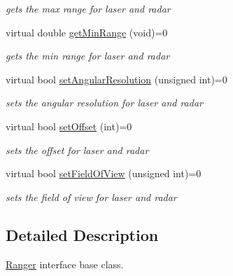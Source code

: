 \begin{DoxyCompactItemize}
\begin{DoxyCompactList}\small\item\em gets the max range for laser and radar \end{DoxyCompactList}\item 
virtual double \hyperlink{classRangerInterface_ae6d501ddeeaad4a7b44d7d51ce64cb88}{get\+Min\+Range} (void)=0\hypertarget{classRangerInterface_ae6d501ddeeaad4a7b44d7d51ce64cb88}{}\label{classRangerInterface_ae6d501ddeeaad4a7b44d7d51ce64cb88}

\begin{DoxyCompactList}\small\item\em gets the min range for laser and radar \end{DoxyCompactList}\item 
virtual bool \hyperlink{classRangerInterface_a313296ae5d13c6acce69caaf646ea66e}{set\+Angular\+Resolution} (unsigned int)=0\hypertarget{classRangerInterface_a313296ae5d13c6acce69caaf646ea66e}{}\label{classRangerInterface_a313296ae5d13c6acce69caaf646ea66e}

\begin{DoxyCompactList}\small\item\em sets the angular resolution for laser and radar \end{DoxyCompactList}\item 
virtual bool \hyperlink{classRangerInterface_ae72584d83c94678d76f3fca20e432713}{set\+Offset} (int)=0\hypertarget{classRangerInterface_ae72584d83c94678d76f3fca20e432713}{}\label{classRangerInterface_ae72584d83c94678d76f3fca20e432713}

\begin{DoxyCompactList}\small\item\em sets the offset for laser and radar \end{DoxyCompactList}\item 
virtual bool \hyperlink{classRangerInterface_ad10f43a01e5285a654f09357028b1bb4}{set\+Field\+Of\+View} (unsigned int)=0\hypertarget{classRangerInterface_ad10f43a01e5285a654f09357028b1bb4}{}\label{classRangerInterface_ad10f43a01e5285a654f09357028b1bb4}

\begin{DoxyCompactList}\small\item\em sets the field of view for laser and radar \end{DoxyCompactList}\end{DoxyCompactItemize}


\subsection{Detailed Description}
\hyperlink{classRanger}{Ranger} interface base class. 

